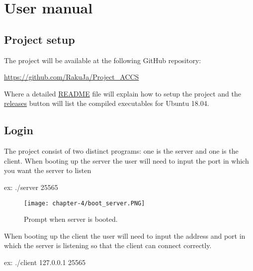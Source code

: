 
\chapter{User manual}
\label{cap:user-manual}

\section{Project setup}

The project will be available at the following GitHub repository: \newline{}
\centerline{\href{https://github.com/RakuJa/Project\_ACCS}{https://github.com/RakuJa/Project\_ACCS}} \newline{}
Where a detailed \href{https://github.com/RakuJa/Project_ACCS/blob/main/README.MD}{README} file will explain how to setup the project and the \href{https://github.com/RakuJa/Project_ACCS/releases}{releases} button will list the compiled executables for Ubuntu 18.04.

\section{Login}

The project consist of two distinct programs: one is the server and one is the client.
When booting up the server the user will need to input the port in which you want the server to listen \newline{}
\centerline{ex: ./server 25565} \newline{}

\begin{figure}[!h] 
    \centering 
    \texttt{[image: chapter-4/boot\_server.PNG]} 
    \caption{Prompt when server is booted.}
    \label{fig:booted_server_prompt}
\end{figure}
When booting up the client the user will need to input the address and port in which the server is listening so that the client can connect correctly. \newline{}
\centerline{ex: ./client 127.0.0.1 25565} \newline{}

